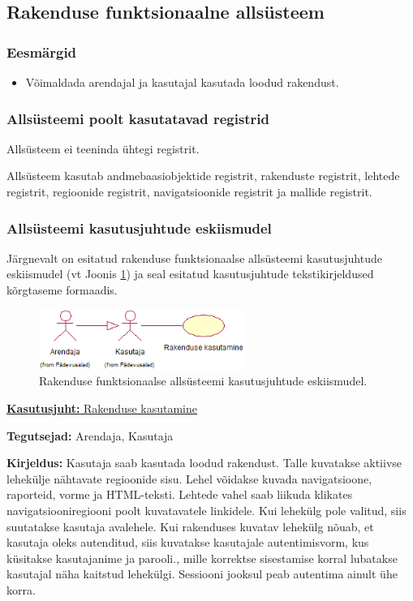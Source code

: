 \documentclass[a4paper,12pt]{article} %
\begin{document}
\subsection{Rakenduse funktsionaalne allsüsteem}
\subsubsection{Eesmärgid}
\begin{itemize}
\item Võimaldada arendajal ja kasutajal kasutada loodud rakendust.
\end{itemize}
\subsubsection{Allsüsteemi poolt kasutatavad registrid}
Allsüsteem ei teeninda ühtegi registrit.\par
Allsüsteem kasutab andmebaasiobjektide registrit, rakenduste registrit, lehtede registrit, regioonide registrit, navigatsioonide registrit ja mallide registrit.
\subsubsection{Allsüsteemi kasutusjuhtude eskiismudel}
Järgnevalt on esitatud rakenduse funktsionaalse allsüsteemi kasutusjuhtude eskiismudel (vt Joonis \ref{fig_rakenduse_funktsionaalse_allsüsteemi_kasutusjuhtude_eskiismudel}) ja seal esitatud kasutusjuhtude tekstikirjeldused kõrgtaseme formaadis.
\begin{figure}[H]
\centering
\includegraphics[width=0.6\textwidth]{./diagrams/application-subsystem-use-case-digram.png}
\caption{Rakenduse funktsionaalse allsüsteemi kasutusjuhtude eskiismudel.}
\label{fig_rakenduse_funktsionaalse_allsüsteemi_kasutusjuhtude_eskiismudel}
\end{figure}

\underline{\textbf{Kasutusjuht:} Rakenduse kasutamine}
\par
\textbf{Tegutsejad:} Arendaja, Kasutaja
\par
\textbf{Kirjeldus:} Kasutaja saab kasutada loodud rakendust. Talle kuvatakse aktiivse lehekülje nähtavate regioonide sisu. Lehel võidakse kuvada navigatsioone, raporteid, vorme ja HTML-teksti. Lehtede vahel saab liikuda klikates navigatsiooniregiooni poolt kuvatavatele linkidele. Kui lehekülg pole valitud, siis suutatakse kasutaja avalehele. Kui rakenduses kuvatav lehekülg nõuab, et kasutaja oleks autenditud, siis kuvatakse kasutajale autentimisvorm, kus küsitakse kasutajanime ja parooli., mille korrektse sisestamise korral lubatakse kasutajal näha kaitstud lehekülgi. Sessiooni jooksul peab autentima ainult ühe korra.
\par
\end{document}
